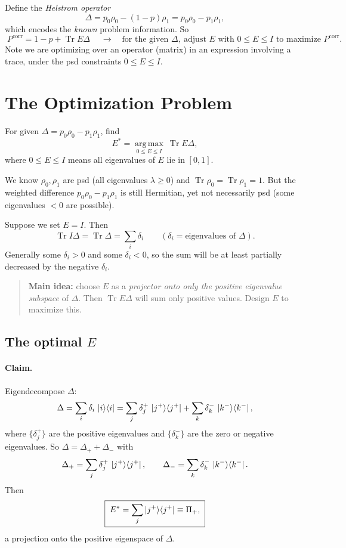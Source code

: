 \documentclass[11pt]{article}
\newcommand{\Tr}{\operatorname{Tr}}
\newcommand{\argmax}{\operatorname*{arg\,max}}
\begin{document}
Define the \emph{Helstrom operator}
\[
\boxed{\; \Delta = p_0\rho_0 - (1-p)\rho_1 = p_0\rho_0 - p_1\rho_1, \;}
\]
which encodes the \emph{known} problem information. So
\[
\boxed{\; P^{\mathrm{corr}} = 1-p + \Tr E\Delta \;}
\quad\longrightarrow\quad
\text{for the given }\Delta,\ \text{adjust } E \text{ with } 0\le E\le I
\text{ to maximize } P^{\mathrm{corr}}.
\]
Note we are optimizing over an operator (matrix) in an expression involving a
trace, under the psd constraints $0\le E\le I$.

\section{The Optimization Problem}

For given $\Delta = p_0\rho_0 - p_1\rho_1$, find
\[
\boxed{\; E^{*} = \argmax_{0\le E\le I}\ \Tr E\Delta, \;}
\]
where $0\le E\le I$ means all eigenvalues of $E$ lie in $[0,1]$.

We know $\rho_0,\rho_1$ are psd (all eigenvalues $\lambda\ge 0$) and
$\Tr\rho_0=\Tr\rho_1=1$. But the weighted difference $p_0\rho_0-p_1\rho_1$ is
still Hermitian, yet not necessarily psd (some eigenvalues $<0$ are possible).

Suppose we set $E=I$. Then
\[
\Tr I\Delta = \Tr\Delta = \sum_i \delta_i
\qquad(\delta_i = \text{eigenvalues of }\Delta).
\]
Generally some $\delta_i>0$ and some $\delta_i<0$, so the sum will be at least
partially decreased by the negative $\delta_i$.

\begin{quote}
\textbf{Main idea:} choose $E$ as a \emph{projector onto only the positive
eigenvalue subspace} of $\Delta$. Then $\Tr E\Delta$ will sum only positive
values. Design $E$ to maximize this.
\end{quote}

\subsection{The optimal $E$}

\paragraph{Claim.}
Eigendecompose $\Delta$:
\[
\Delta = \sum_i \delta_i\,\ket{i}\!\bra{i}
= \sum_j \delta_j^{+}\,\ket{j^{+}}\!\bra{j^{+}}
+ \sum_k \delta_k^{-}\,\ket{k^{-}}\!\bra{k^{-}},
\]
where $\{\delta_j^{+}\}$ are the positive eigenvalues and $\{\delta_k^{-}\}$
are the zero or negative eigenvalues. So $\Delta=\Delta_{+}+\Delta_{-}$ with
\[
\Delta_{+} = \sum_j \delta_j^{+}\,\ket{j^{+}}\!\bra{j^{+}},
\qquad
\Delta_{-} = \sum_k \delta_k^{-}\,\ket{k^{-}}\!\bra{k^{-}}.
\]
Then
\[
\boxed{\; E^{*} = \sum_j \ket{j^{+}}\!\bra{j^{+}} \equiv \Pi_{+}, \;}
\]
a projection onto the positive eigenspace of $\Delta$.
\end{document}
